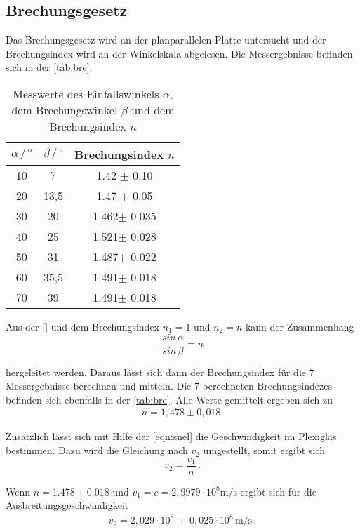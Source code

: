 \subsection{Brechungsgesetz}
Das Brechungsgesetz wird an der planparallelen Platte untersucht und der Brechungsindex wird an der Winkelskala abgelesen. Die Messergebnisse befinden sich in der \autoref{tab:bre}. 
\begin{table}
    \centering
    \caption{Messwerte des Einfallswinkels $\alpha$, dem Brechungswinkel $\beta$ und dem Brechungsindex $n$}
    \label{tab:bre}
    \begin{tabular}{c c c}
    \toprule
         $\alpha \, / \, ° $ & $\beta \, / \, °$ & Brechungsindex $n$\\
    \midrule
    10 & 7    & 1.42 $\pm$ 0.10\\
    20 & 13,5 & 1.47 $\pm$ 0.05\\
    30 & 20   & 1.462$\pm$ 0.035\\
    40 & 25   & 1.521$\pm$ 0.028\\
    50 & 31   & 1.487$\pm$ 0.022\\
    60 & 35,5 & 1.491$\pm$ 0.018\\
    70 & 39   & 1.491$\pm$ 0.018\\
    \bottomrule
    \end{tabular}
\end{table}

\noindent
Aus der \autoref{} und dem Brechungsindex $n_1 = 1$ und $n_2 = n$ kann der Zusammenhang 
\begin{equation}
    \frac{sin \, \alpha}{sin \, \beta} = n
\end{equation}

\noindent
hergeleitet werden.
Daraus lässt sich dann der Brechungsindex für die 7 Messergebnisse berechnen und mitteln. Die 7 berechneten Brechungsindezes befinden sich ebenfalls in der \autoref{tab:bre}.
Alle Werte gemittelt ergeben sich zu 
\begin{align*}
    n = 1,478 \pm 0,018.
\end{align*} 

Zusätzlich lässt sich mit Hilfe der \autoref{eqn:snel} die Geschwindigkeit im Plexiglas bestimmen. Dazu wird die Gleichung nach $v_2$ umgestellt, somit ergibt sich
\begin{equation}
    v_2 = \frac{v_1}{n} \, .
\end{equation}

\noindent
Wenn $n = 1.478 \pm 0.018$ und $v_1 = c = 2,9979 \cdot 10^8 \si{\meter\per\second}$ ergibt sich für die Ausbreitungsgeschwindigkeit
\begin{align*}
    v_2 = 2,029 \cdot 10^8 \, \pm \, 0,025 \cdot 10^8 \, \si{\meter\per\second} \, .
\end{align*}

